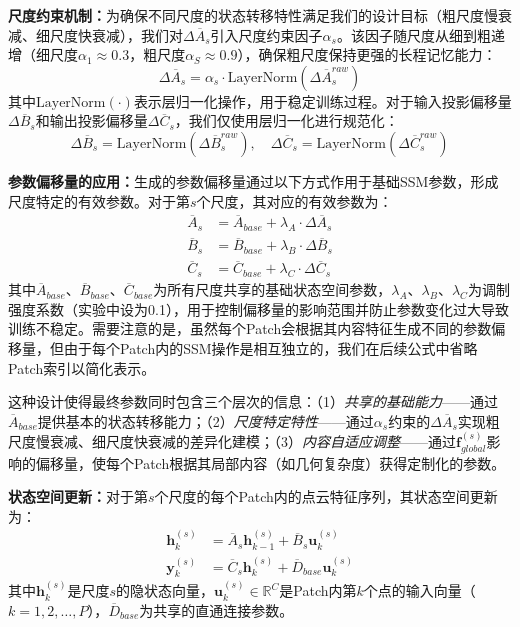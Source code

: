 \documentclass[preprint,12pt]{elsarticle}
\begin{document}
\textbf{尺度约束机制：}为确保不同尺度的状态转移特性满足我们的设计目标（粗尺度慢衰减、细尺度快衰减），我们对$\Delta\overline{A}_s$引入尺度约束因子$\alpha_s$。该因子随尺度从细到粗递增（细尺度$\alpha_1 \approx 0.3$，粗尺度$\alpha_S \approx 0.9$），确保粗尺度保持更强的长程记忆能力：
\begin{equation}
	\Delta\overline{A}_s = \alpha_s \cdot \text{LayerNorm}(\Delta\overline{A}_s^{raw})
\end{equation}
其中$\text{LayerNorm}(\cdot)$表示层归一化操作，用于稳定训练过程。对于输入投影偏移量$\Delta\overline{B}_s$和输出投影偏移量$\Delta\overline{C}_s$，我们仅使用层归一化进行规范化：
\begin{equation}
	\Delta\overline{B}_s = \text{LayerNorm}(\Delta\overline{B}_s^{raw}), \quad
	\Delta\overline{C}_s = \text{LayerNorm}(\Delta\overline{C}_s^{raw})
\end{equation}

\textbf{参数偏移量的应用：}生成的参数偏移量通过以下方式作用于基础SSM参数，形成尺度特定的有效参数。对于第$s$个尺度，其对应的有效参数为：
\begin{equation}
	\begin{aligned}
		\overline{A}_s &= \overline{A}_{base} + \lambda_A \cdot \Delta\overline{A}_s \\
		\overline{B}_s &= \overline{B}_{base} + \lambda_B \cdot \Delta\overline{B}_s \\
		\overline{C}_s &= \overline{C}_{base} + \lambda_C \cdot \Delta\overline{C}_s
	\end{aligned}
	\label{eq:param_modulation}
\end{equation}
其中$\overline{A}_{base}$、$\overline{B}_{base}$、$\overline{C}_{base}$为所有尺度共享的基础状态空间参数，$\lambda_A$、$\lambda_B$、$\lambda_C$为调制强度系数（实验中设为0.1），用于控制偏移量的影响范围并防止参数变化过大导致训练不稳定。需要注意的是，虽然每个Patch会根据其内容特征生成不同的参数偏移量，但由于每个Patch内的SSM操作是相互独立的，我们在后续公式中省略Patch索引以简化表示。

这种设计使得最终参数同时包含三个层次的信息：（1）\textit{共享的基础能力}——通过$\overline{A}_{base}$提供基本的状态转移能力；（2）\textit{尺度特定特性}——通过$\alpha_s$约束的$\Delta\overline{A}_s$实现粗尺度慢衰减、细尺度快衰减的差异化建模；（3）\textit{内容自适应调整}——通过$\mathbf{f}_{global}^{(s)}$影响的偏移量，使每个Patch根据其局部内容（如几何复杂度）获得定制化的参数。

\textbf{状态空间更新：}对于第$s$个尺度的每个Patch内的点云特征序列，其状态空间更新为：
\begin{equation}
	\begin{aligned}
		\mathbf{h}_k^{(s)} &= \overline{A}_s \mathbf{h}_{k-1}^{(s)} + \overline{B}_s \mathbf{u}_k^{(s)} \\
		\mathbf{y}_k^{(s)} &= \overline{C}_s \mathbf{h}_k^{(s)} + \overline{D}_{base} \mathbf{u}_k^{(s)}
	\end{aligned}
	\label{eq:asd_ssm_update}
\end{equation}
其中$\mathbf{h}_k^{(s)}$是尺度$s$的隐状态向量，$\mathbf{u}_k^{(s)} \in \mathbb{R}^C$是Patch内第$k$个点的输入向量（$k=1,2,\ldots,P$），$\overline{D}_{base}$为共享的直通连接参数。
\end{document}
